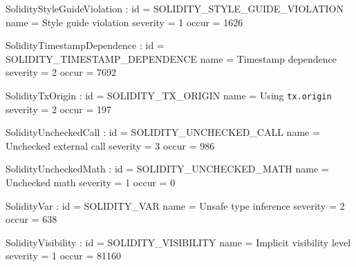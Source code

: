 \setparameter SolidityStyleGuideViolation :
id 			= SOLIDITY\_STYLE\_GUIDE\_VIOLATION
name 		= {Style guide violation}
severity 	= 1
occur	= 1626

\setparameter SolidityTimestampDependence :
id 			= SOLIDITY\_TIMESTAMP\_DEPENDENCE
name 		= {Timestamp dependence}
severity 	= 2
occur	= 7692

\setparameter SolidityTxOrigin :
id 			= SOLIDITY\_TX\_ORIGIN
name 		= {Using \texttt{tx.origin}}
severity 	= 2
occur	= 197

\setparameter SolidityUncheckedCall :
id 			= SOLIDITY\_UNCHECKED\_CALL
name 		= {Unchecked external call}
severity 	= 3
occur	= 986

\setparameter SolidityUncheckedMath :
id 			= SOLIDITY\_UNCHECKED\_MATH
name 		= {Unchecked math}
severity 	= 1
occur	= 0

\setparameter SolidityVar :
id 			= SOLIDITY\_VAR
name 		= {Unsafe type inference}
severity 	= 2
occur	= 638

\setparameter SolidityVisibility :
id 			= SOLIDITY\_VISIBILITY
name 		= {Implicit visibility level}
severity 	= 1
occur	= 81160

\let\letcs\etoolboxletcs %
